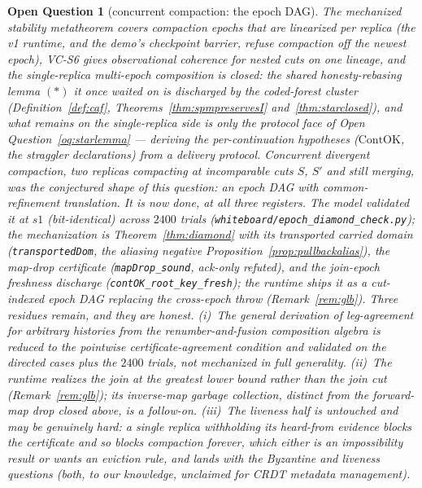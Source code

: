 \documentclass[11pt]{article}
\newtheorem{openq}[theorem]{Open Question}
\newcommand{\lean}[1]{\texttt{#1}}
\newcommand{\code}[1]{\texttt{#1}}
\begin{document}
\begin{openq}[concurrent compaction: the epoch DAG]
\label{oq:epochdag}
The mechanized stability metatheorem covers compaction epochs that are
linearized per replica (the v1 runtime, and the demo's checkpoint
barrier, refuse compaction off the newest epoch), VC-S6 gives
observational coherence for nested cuts on one lineage, and the
single-replica multi-epoch composition is closed: the shared
honesty-rebasing lemma $(\ast)$ it once waited on is discharged by the
coded-forest cluster (Definition~\ref{def:caf},
Theorems~\ref{thm:spmpreservesI} and~\ref{thm:starclosed}), and what
remains on the single-replica side is only the protocol face of Open
Question~\ref{oq:starlemma} --- deriving the per-continuation
hypotheses ($\mathrm{ContOK}$, the straggler declarations) from a
delivery protocol. Concurrent
\emph{divergent} compaction, two replicas compacting at incomparable
cuts $S$, $S'$ and still merging, was the conjectured shape of this
question: an epoch DAG with common-refinement translation. It is now
\emph{done}, at all three registers. The model validated it at $s1$
(bit-identical) across $2400$ trials
(\code{whiteboard/epoch\_diamond\_check.py}); the mechanization is
Theorem~\ref{thm:diamond} with its transported carried domain
(\lean{transportedDom}, the aliasing negative
Proposition~\ref{prop:pullbackalias}), the map-drop certificate
(\lean{mapDrop\_sound}, ack-only refuted), and the join-epoch freshness
discharge (\lean{contOK\_root\_key\_fresh}); the runtime ships it as a
cut-indexed epoch DAG replacing the cross-epoch throw
(Remark~\ref{rem:glb}). Three residues remain, and they are honest.
(i)~The \emph{general} derivation of leg-agreement for arbitrary
histories from the renumber-and-fusion composition algebra is reduced to
the pointwise certificate-agreement condition and validated on the
directed cases plus the $2400$ trials, not mechanized in full
generality. (ii)~The runtime realizes the join at the greatest lower
bound rather than the join cut (Remark~\ref{rem:glb}); its inverse-map
garbage collection, distinct from the forward-map drop closed above,
is a follow-on. (iii)~The \emph{liveness} half is untouched and may be
genuinely hard: a single replica withholding its heard-from evidence
blocks the certificate and so blocks compaction forever, which either is
an impossibility result or wants an eviction rule, and lands with the
Byzantine and liveness questions (both, to our knowledge, unclaimed for
CRDT metadata management).
\end{openq}
\end{document}
